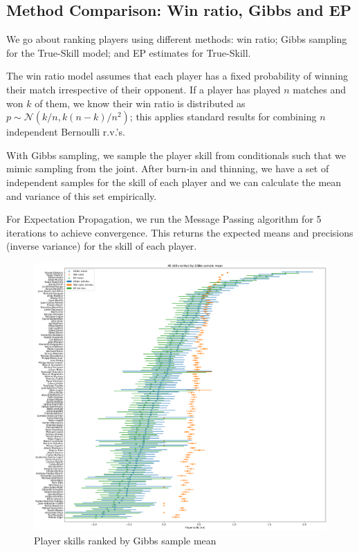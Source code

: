 \documentclass[]{article}
\newcommand{\Ncal}{\mathcal{N}}
\begin{document}
\clearpage
\subsection{Method Comparison: Win ratio, Gibbs and EP}

We go about ranking players using different methods: win ratio; Gibbs sampling for the True-Skill model; and EP estimates for True-Skill.

The win ratio model assumes that each player has a fixed probability of winning their match irrespective of their opponent. If a player has played $n$ matches and won $k$ of them, we know their win ratio is distributed as $p \sim \Ncal(k/n, k(n-k)/n^2)$; this applies standard results for combining $n$ independent Bernoulli r.v.'s.

With Gibbs sampling, we sample the player skill from conditionals such that we mimic sampling from the joint. After burn-in and thinning, we have a set of independent samples for the skill of each player and we can calculate the mean and variance of this set empirically.

For Expectation Propagation, we run the Message Passing algorithm for 5 iterations to achieve convergence. This returns the expected means and precisions (inverse variance) for the skill of each player.

\begin{figure}[!h]
	\centering
	\includegraphics[width=\linewidth]{combined-ranking.png}
	\caption{Player skills ranked by Gibbs sample mean}
	\label{fig:combined-ranking}
\end{figure}
\end{document}
